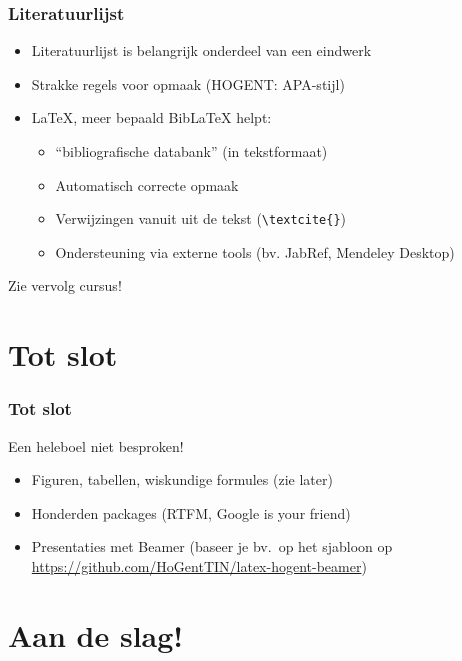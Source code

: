\documentclass[aspectratio=169]{beamer}
\begin{document}
\begin{frame}[fragile]
  \frametitle{Literatuurlijst}

  \begin{itemize}
    \item<+-> Literatuurlijst is belangrijk onderdeel van een eindwerk
    \item<+-> Strakke regels voor opmaak (HOGENT: APA-stijl)
    \item<+-> {\LaTeX}, meer bepaald Bib{\LaTeX} helpt:
    \begin{itemize}
      \item<+-> ``bibliografische databank'' (in tekstformaat)
      \item<+-> Automatisch correcte opmaak
      \item<+-> Verwijzingen vanuit uit de tekst (\verb|\textcite{}|)
      \item<+-> Ondersteuning via externe tools (bv. JabRef, Mendeley Desktop)
    \end{itemize}
  \end{itemize}

  \pause{} Zie vervolg cursus!
\end{frame}

\section{Tot slot}

\begin{frame}[fragile]
 \frametitle{Tot slot}

  Een heleboel niet besproken!

  \begin{itemize}
    \item<+-> Figuren, tabellen, wiskundige formules (zie later)
    \item<+-> Honderden packages (RTFM, Google is your friend)
    \item<+-> Presentaties met Beamer (baseer je bv.\ op het sjabloon op \url{https://github.com/HoGentTIN/latex-hogent-beamer})

  \end{itemize}
\end{frame}

\section{Aan de slag!}
\end{document}
